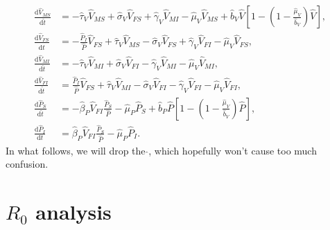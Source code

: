 \documentclass{article}
\newcommand{\md}{\mathrm{d}}
\begin{document}
\begin{equation}
  \label{odesystem}
  \begin{split}
    \frac{\md \hat{V}_{MS}}{\md \hat{t}}
    &=
    - \hat{\tau}_V \hat{V}_{MS}
    + \hat{\sigma}_V \hat{V}_{FS}
    + \hat{\gamma}_V \hat{V}_{MI}
    - \hat{\mu}_V \hat{V}_{MS}
    + \hat{b}_V \hat{V} \left[
      1 - \left(1 - \frac{\hat{\mu}_V}{\hat{b}_V}\right)
      \hat{V}
    \right],
    \\
    \frac{\md \hat{V}_{FS}}{\md \hat{t}}
    &= - \frac{\hat{P}_I}{\hat{P}} \hat{V}_{FS}
    + \hat{\tau}_V \hat{V}_{MS}
    - \hat{\sigma}_V \hat{V}_{FS}
    + \hat{\gamma}_V \hat{V}_{FI}
    - \hat{\mu}_V \hat{V}_{FS},
    \\
    \frac{\md \hat{V}_{MI}}{\md \hat{t}}
    &=
    - \hat{\tau}_V \hat{V}_{MI}
    + \hat{\sigma}_V \hat{V}_{FI}
    - \hat{\gamma}_V \hat{V}_{MI}
    - \hat{\mu}_V \hat{V}_{MI},
    \\
    \frac{\md \hat{V}_{FI}}{\md \hat{t}}
    &=
    \frac{\hat{P}_I}{\hat{P}} \hat{V}_{FS}
    + \hat{\tau}_V \hat{V}_{MI}
    - \hat{\sigma}_V \hat{V}_{FI}
    - \hat{\gamma}_V \hat{V}_{FI}
    - \hat{\mu}_V \hat{V}_{FI},
    \\
    \frac{\md \hat{P}_S}{\md \hat{t}}
    &= - \hat{\beta}_P \hat{V}_{FI} \frac{\hat{P}_S}{\hat{P}}
    - \hat{\mu}_P \hat{P}_S
    + \hat{b}_P \hat{P}
    \left[
      1 - \left(1 - \frac{\hat{\mu}_V}{\hat{b}_V}\right) \hat{P}
    \right],
    \\
    \frac{\md \hat{P}_I}{\md t}
    &= \hat{\beta}_P \hat{V}_{FI} \frac{\hat{P}_S}{\hat{P}}
    - \hat{\mu}_P \hat{P}_I.
  \end{split}
\end{equation}
In what follows, we will drop the $\hat{}$, which hopefully won't
cause too much confusion.

\section{$R_0$ analysis}
\end{document}
